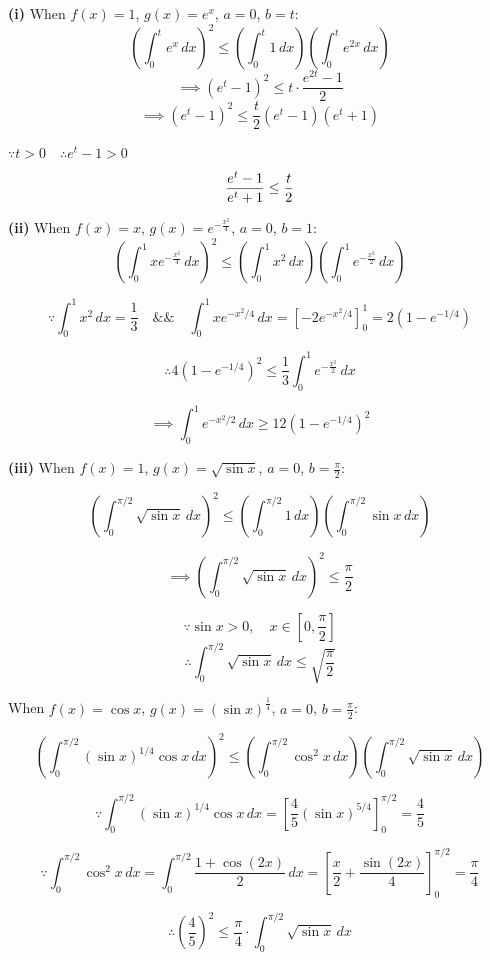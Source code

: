 \documentclass[12pt]{article}
\begin{document}
	\textbf{(i)} When $f(x)=1$, $g(x)=e^x$, $a=0$, $b=t$:
	$$\displaystyle \left( \int_0^t e^x\,dx \right)^2\le \left( \int_0^t 1\,dx \right)\left( \int_0^t e^{2x}\,dx \right)$$
	$$\implies (e^t-1)^2\le t\cdot \frac{e^{2t}-1}{2}$$
	$$\implies (e^t-1)^2\le \frac{t}{2}(e^t-1)(e^t+1)$$

	$\because t>0\quad\therefore e^t-1>0$
	$$\frac{e^t-1}{e^t+1}\le \frac{t}{2}\\$$


	
	\textbf{(ii)} When $f(x)=x$, $g(x)=e^{-\frac{x^2}{4}}$, $a=0$, $b=1$:
	$$\displaystyle \left( \int_0^1 xe^{-\frac{x^2}{4}}\,dx \right)^2\le
	\left( \int_0^1 x^2\,dx \right)\left( \int_0^1 e^{-\frac{x^2}{2}}\,dx \right)$$

	$$ \because \int_0^1 x^2\,dx=\frac13\quad\&\&\quad
	\int_0^1 xe^{-x^2/4}\,dx=\left[-2e^{-x^2/4}\right]_0^1=2(1-e^{-1/4})$$

	$$\therefore 4(1-e^{-1/4})^2\le \frac13\int_0^1 e^{-\frac{x^2}{2}}\,dx $$
	
	$$\implies \int_0^1 e^{-x^2/2}\,dx\ge 12(1-e^{-1/4})^2$$
	


	\textbf{(iii)} When $f(x)=1$, $g(x)=\sqrt{\sin x}$, $a=0$, $b=\frac{\pi}{2}$:

	$$\displaystyle \left( \int_0^{\pi/2} \sqrt{\sin x}\,dx \right)^2\le \left( \int_0^{\pi/2} 1\,dx \right)\left( \int_0^{\pi/2} \sin x\,dx \right)$$
	
	$$\implies \left( \int_0^{\pi/2} \sqrt{\sin x}\,dx \right)^2\le \frac{\pi}{2}$$
	
	$$\because \sin x>0,\quad x \in [0,\frac{\pi}{2}]$$
	$$\therefore \int_0^{\pi/2} \sqrt{\sin x}\,dx\le \sqrt{\frac{\pi}{2}}$$


	When $f(x)=\cos x$, $g(x)=(\sin x)^\frac{1}{4}$, $a=0$, $b=\frac{\pi}{2}$:

	$$\displaystyle \left( \int_0^{\pi/2} (\sin x)^{1/4} \cos x\,dx \right)^2\le \left( \int_0^{\pi/2} \cos^2 x\,dx \right)\left( \int_0^{\pi/2} \sqrt{\sin x}\,dx \right)$$

	$$\because \int_0^{\pi/2} (\sin x)^{1/4} \cos x\,dx = \left[ \frac{4}{5}(\sin x)^{5/4} \right]_0^{\pi/2} = \frac{4}{5}$$

	$$\because \int_0^{\pi/2} \cos^2 x\,dx = \int_0^{\pi/2} \frac{1+\cos(2x)}{2}\,dx = \left[ \frac{x}{2} + \frac{\sin(2x)}{4} \right]_0^{\pi/2} = \frac{\pi}{4}$$


	$$\therefore \left( \frac{4}{5} \right)^2 \le \frac{\pi}{4} \cdot \int_0^{\pi/2} \sqrt{\sin x}\,dx$$
\end{document}
